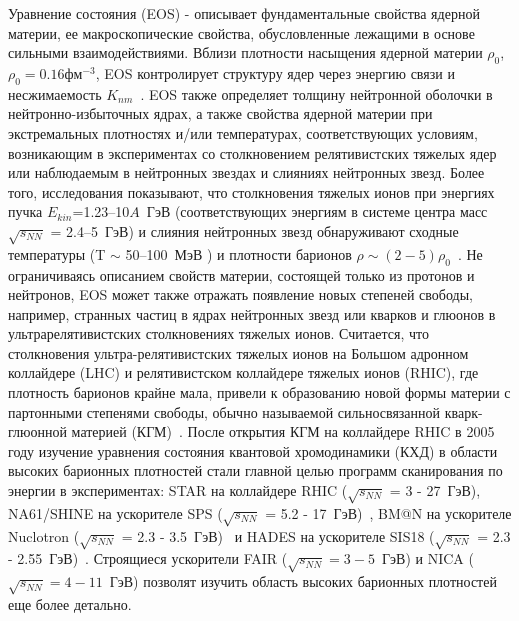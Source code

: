 {\actuality} Уравнение состояния (EOS) - описывает фундаментальные свойства ядерной материи, ее  макроскопические свойства, обусловленные лежащими в основе сильными взаимодействиями.  
Вблизи плотности насыщения ядерной материи $\rho_{0}$, $\rho_{0}=0.16 фм^{-3}$,  EOS контролирует структуру ядер через энергию связи и несжимаемость $K_{nm}$~\cite[B][]{Danielewicz:2002pu}.
EOS также определяет толщину нейтронной оболочки в нейтронно-избыточных ядрах, а также свойства ядерной материи при экстремальных плотностях и/или температурах, соответствующих условиям, возникающим в экспериментах со столкновением релятивистских тяжелых ядер или наблюдаемым в нейтронных звездах  и слияниях нейтронных звезд. 
Более того, исследования показывают, что столкновения тяжелых ионов при энергиях пучка  $E_{kin}$=1.23--10$A$~ГэВ (соответствующих энергиям в системе центра масс $\sqrt{s_{NN}}$ = 2.4--5~ГэВ)  и слияния нейтронных звезд обнаруживают сходные температуры (T $\sim$  50--100~МэВ ) и плотности барионов $\rho \sim (2-5)\rho_{0}$~\cite{Bzdak:2019pkr,Xu:2022mqn}.
Не ограничиваясь описанием свойств материи, состоящей только из протонов и нейтронов, EOS может также отражать появление новых степеней свободы, например, странных частиц в ядрах нейтронных звезд или кварков и глюонов в ультрарелятивистских столкновениях тяжелых ионов. 
Считается, что столкновения ультра-релятивистских тяжелых ионов на Большом адронном коллайдере (LHC) и релятивистском коллайдере тяжелых ионов (RHIC), где  плотность барионов крайне мала, привели к образованию новой формы материи с партонными степенями свободы, обычно называемой сильносвязанной кварк-глюонной материей (КГМ)~\cite{Esumi:2022uas}.
После открытия КГМ на коллайдере RHIC в 2005 году изучение уравнения состояния  квантовой хромодинамики (КХД) в области высоких барионных плотностей стали главной целью программ сканирования по энергии в экспериментах: STAR на коллайдере RHIC ($\sqrt{s_{NN}}$ = 3 - 27~ГэВ), NA61/SHINE на ускорителе  SPS ($\sqrt{s_{NN}}$ = 5.2 - 17~ГэВ)~\cite{NA61:2014lfx}, BM@N на ускорителе Nuclotron ($\sqrt{s_{NN}}$ = 2.3 - 3.5~ГэВ)~\cite{Senger:2022bzm} и   HADES на ускорителе  SIS18 ($\sqrt{s_{NN}}$ = 2.3 - 2.55~ГэВ)~\cite{HADES:2009aat}. 
Строящиеся ускорители FAIR ($\sqrt{s_{NN}}=3-5$~ГэВ) и NICA ($\sqrt{s_{NN}}=4-11$~ГэВ)  позволят изучить  область высоких барионных плотностей еще более детально.

